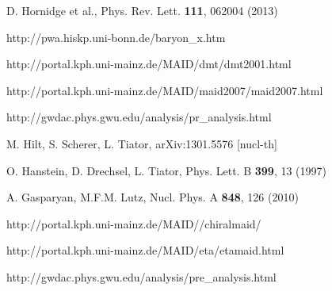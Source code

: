 \documentclass[a4paper,10pt]{article}
\def\tt{\ttfamily}
\def\rm{\rmfamily}
\begin{document}
\begin{thebibliography}{00}



D. Hornidge et al.,
Phys. Rev. Lett. \textbf{111}, 062004 (2013)

\tt http://pwa.hiskp.uni-bonn.de/baryon\_x.htm\rm

\tt http://portal.kph.uni-mainz.de/MAID/dmt/dmt2001.html\rm

\tt http://portal.kph.uni-mainz.de/MAID/maid2007/maid2007.html\rm

\tt http://gwdac.phys.gwu.edu/analysis/pr\_analysis.html\rm

M. Hilt, S. Scherer, L. Tiator,
arXiv:1301.5576 [nucl-th]

O. Hanstein, D. Drechsel, L. Tiator,
Phys. Lett. B \textbf{399}, 13 (1997)

A. Gasparyan, M.F.M. Lutz,
Nucl. Phys. A \textbf{848}, 126 (2010)

\tt http://portal.kph.uni-mainz.de/MAID//chiralmaid/\rm

\tt http://portal.kph.uni-mainz.de/MAID/eta/etamaid.html\rm

\tt http://gwdac.phys.gwu.edu/analysis/pre\_analysis.html\rm

\end{thebibliography}
\end{document}
